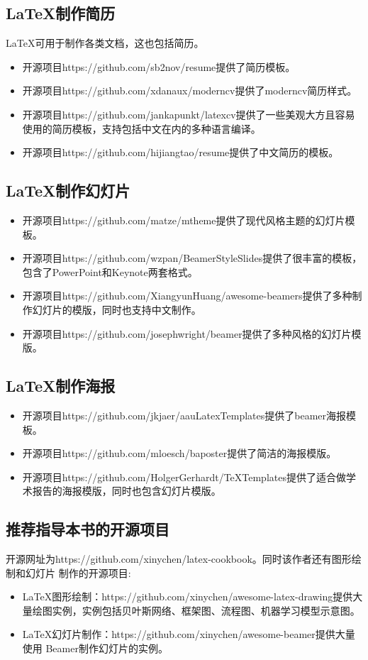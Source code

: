 \subsection{\LaTeX 制作简历}
LaTeX可用于制作各类文档，这也包括简历。

\begin{itemize}
    \item 开源项目https://github.com/sb2nov/resume提供了简历模板。
    \item 开源项目https://github.com/xdanaux/moderncv提供了moderncv简历样式。
    \item 开源项目https://github.com/jankapunkt/latexcv提供了一些美观大方且容易使用的简历模板，支持包括中文在内的多种语言编译。
    \item 开源项目https://github.com/hijiangtao/resume提供了中文简历的模板。
\end{itemize}

\subsection{\LaTeX 制作幻灯片}
\begin{itemize}
    \item 开源项目https://github.com/matze/mtheme提供了现代风格主题的幻灯片模板。
    \item 开源项目https://github.com/wzpan/BeamerStyleSlides提供了很丰富的模板，包含了PowerPoint和Keynote两套格式。
    \item 开源项目https://github.com/XiangyunHuang/awesome-beamers提供了多种制作幻灯片的模版，同时也支持中文制作。
    \item 开源项目https://github.com/josephwright/beamer提供了多种风格的幻灯片模版。
\end{itemize}

\subsection{\LaTeX 制作海报}
\begin{itemize}
    \item 开源项目https://github.com/jkjaer/aauLatexTemplates提供了beamer海报模板。
    \item 开源项目https://github.com/mloesch/baposter提供了简洁的海报模版。
    \item 开源项目https://github.com/HolgerGerhardt/TeXTemplates提供了适合做学术报告的海报模版，同时也包含幻灯片模版。
\end{itemize}

\subsection{推荐指导本书的开源项目}
开源网址为https://github.com/xinychen/latex-cookbook。同时该作者还有图形绘制和幻灯片
制作的开源项目:
\begin{itemize}
    \item LaTeX图形绘制：https://github.com/xinychen/awesome-latex-drawing提供大
          量绘图实例，实例包括贝叶斯网络、框架图、流程图、机器学习模型示意图。
    \item LaTeX幻灯片制作：https://github.com/xinychen/awesome-beamer提供大量使用
          Beamer制作幻灯片的实例。
\end{itemize}

